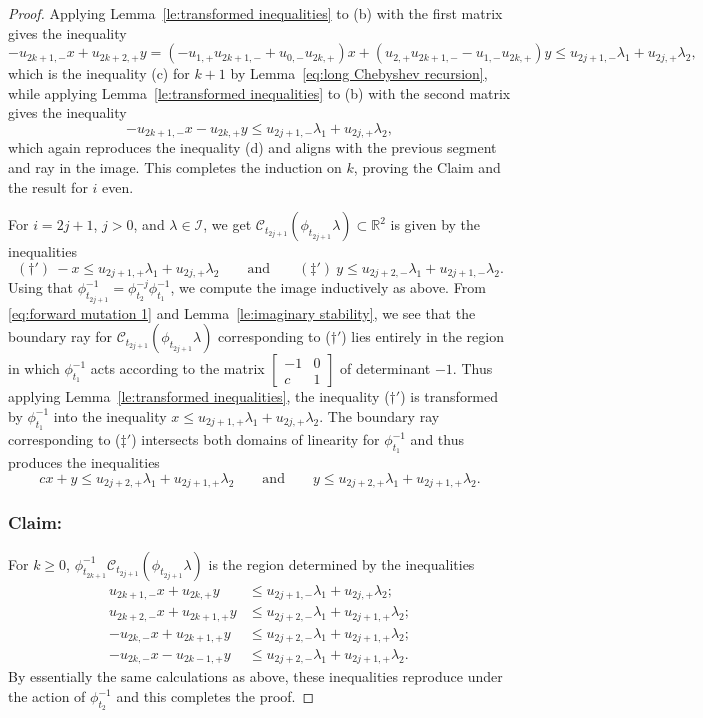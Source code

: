\documentclass{amsart}
\numberwithin{theorem}{section}
\newcommand{\cC}{\mathcal{C}}
\newcommand{\cI}{\mathcal{I}}
\newcommand{\RR}{\mathbb{R}}
\begin{document}
\begin{proof}
    Applying Lemma~\ref{le:transformed inequalities} to (b) with the first matrix gives the inequality 
    \[-u_{2k+1,-}x+u_{2k+2,+}y=(-u_{1,+}u_{2k+1,-}+u_{0,-}u_{2k,+})x+(u_{2,+}u_{2k+1,-}-u_{1,-}u_{2k,+})y\le u_{2j+1,-}\lambda_1+u_{2j,+}\lambda_2,\]
    which is the inequality (c) for $k+1$ by Lemma~\ref{eq:long Chebyshev recursion}, while applying Lemma~\ref{le:transformed inequalities} to (b) with the second matrix gives the inequality 
    \[-u_{2k+1,-}x-u_{2k,+}y\le u_{2j+1,-}\lambda_1+u_{2j,+}\lambda_2,\]
    which again reproduces the inequality (d) and aligns with the previous segment and ray in the image.
    This completes the induction on $k$, proving the Claim and the result for $i$ even.

    For $i=2j+1$, $j>0$, and $\lambda\in\cI$, we get $\cC_{t_{2j+1}}(\phi_{t_{2j+1}}\lambda)\subset\RR^2$ is given by the inequalities 
    \[ (\dagger')\ -x\le u_{2j+1,+}\lambda_1+u_{2j,+}\lambda_2 \qquad\text{and}\qquad (\ddagger')\ y\le u_{2j+2,-}\lambda_1+u_{2j+1,-}\lambda_2.\]
    Using that $\phi_{t_{2j+1}}^{-1}=\phi_{t_2}^{-j}\phi_{t_1}^{-1}$, we compute the image inductively as above.
    From \eqref{eq:forward mutation 1} and Lemma~\ref{le:imaginary stability}, we see that the boundary ray for $\cC_{t_{2j+1}}(\phi_{t_{2j+1}}\lambda)$ corresponding to ($\dagger'$) lies entirely in the region in which $\phi_{t_1}^{-1}$ acts according to the matrix $\left[ \begin{array}{cc} -1 & 0\\ c & 1 \end{array}\right]$ of determinant $-1$.
    Thus applying Lemma~\ref{le:transformed inequalities}, the inequality ($\dagger'$) is transformed by $\phi_{t_1}^{-1}$ into the inequality $x\le u_{2j+1,+}\lambda_1+u_{2j,+}\lambda_2$.
    The boundary ray corresponding to ($\ddagger'$) intersects both domains of linearity for $\phi_{t_1}^{-1}$ and thus produces the inequalities
    \[ cx+y\le u_{2j+2,+}\lambda_1+u_{2j+1,+}\lambda_2 \qquad\text{and}\qquad  y\le u_{2j+2,+}\lambda_1+u_{2j+1,+}\lambda_2.\]


    \subsubsection*{Claim:} For $k\ge 0$, $\phi_{t_{2k+1}}^{-1}\cC_{t_{2j+1}}(\phi_{t_{2j+1}}\lambda)$ is the region determined by the inequalities 
    \begin{align*}
      \tag{a$'$} u_{2k+1,-}x+u_{2k,+}y &\le u_{2j+1,-}\lambda_1+u_{2j,+}\lambda_2;\\
      \tag{b$'$} u_{2k+2,-}x+u_{2k+1,+}y &\le u_{2j+2,-}\lambda_1+u_{2j+1,+}\lambda_2;\\
      \tag{c$'$} -u_{2k,-}x+u_{2k+1,+}y &\le u_{2j+2,-}\lambda_1+u_{2j+1,+}\lambda_2;\\
      \tag{d$'$} -u_{2k,-}x-u_{2k-1,+}y &\le u_{2j+2,-}\lambda_1+u_{2j+1,+}\lambda_2.
    \end{align*}
    By essentially the same calculations as above, these inequalities reproduce under the action of $\phi_{t_2}^{-1}$ and this completes the proof.
  \end{proof}
\end{document}
